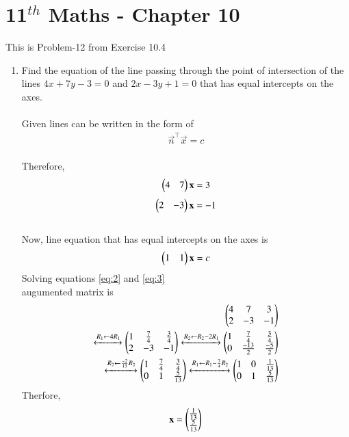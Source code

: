 \documentclass[12pt]{article}
\begin{document}
\section*{11$^{th}$ Maths - Chapter 10}
This is Problem-12 from Exercise 10.4
\begin{enumerate}
    \item Find the equation of the line passing through the point of intersection of the lines $4x + 7y - 3 = 0$ and $2x - 3y + 1 = 0$ that has equal intercepts on the axes.\\
    \solution \\
    Given lines can be written in the form of \begin{align}
        \Vec{n}^{\top}\Vec{x} = c
    \end{align}
   \\Therefore,\\
		\begin{align}
       \begin{pmatrix}4&7\end{pmatrix}\mathbf{x}=3
       \label{eq:2}
   \end{align} 
   \begin{align}
       \begin{pmatrix}2&-3\end{pmatrix}\mathbf{x}=-1
       \label{eq:3}
   \end{align}\\
   Now, line equation that has equal intercepts on the axes is
   \begin{align}
       \myvec{1 & 1}\Vec{x}=c
       \label{eq:4}
   \end{align}
   Solving equations \eqref{eq:2} and \eqref{eq:3}
		\\augumented matrix is
 \begin{align}
    \begin{pmatrix}4&7&3\\2&-3&-1\end{pmatrix}\\
    \xleftrightarrow{R_1 \leftarrow 4 R_1}
    \begin{pmatrix}1&\frac{7}{4}&\frac{3}{4}\\2&-3&-1\end{pmatrix}
    \xleftrightarrow{R_2 \leftarrow R_2 - 2R_1}
    \begin{pmatrix}1&\frac{7}{4}&\frac{3}{4}\\0&\frac{-13}{2}&\frac{-5}{2}\end{pmatrix}\\
    \xleftrightarrow{R_2 \leftarrow \frac{-2}{13}R_2}
    \begin{pmatrix}1&\frac{7}{4}&\frac{3}{4}\\0&1&\frac{5}{13}\end{pmatrix}
    \xleftrightarrow{R_1 \leftarrow R_1-\frac{7}{4}R_2}
    \begin{pmatrix}1&0&\frac{1}{13}\\0&1&\frac{5}{13}\end{pmatrix}
\end{align}
Therfore, \begin{align}    
\mathbf{x} = \begin{pmatrix}\frac{1}{13}\\\frac{5}{13}\end{pmatrix}
\end{align}

\end{enumerate}
\end{document}
